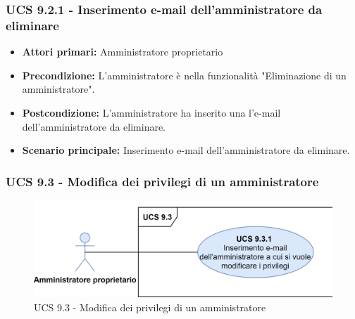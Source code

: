 \subsubsection{UCS 9.2.1 - Inserimento e-mail dell'amministratore da eliminare}%
\begin{itemize}
\item \textbf{Attori primari:} Amministratore proprietario
\item \textbf{Precondizione:} L'amministratore è nella funzionalità "Eliminazione di un amministratore".
\item \textbf{Postcondizione:} L'amministratore ha inserito una l'e-mail dell'amministratore da eliminare.
\item \textbf{Scenario principale:} Inserimento e-mail dell'amministratore da eliminare.
\end{itemize}

\subsubsection{UCS 9.3 - Modifica dei privilegi di un amministratore}%

\begin{figure}[h]
  \centering
    \includegraphics[scale=1.0]{Sezioni/UseCase/Immagini/UCS9.3.png}
  \caption{UCS 9.3 - Modifica dei privilegi di un amministratore}
\end{figure}


